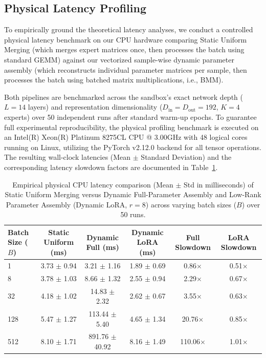 \documentclass{article}
\theoremstyle{plain}
\theoremstyle{definition}
\theoremstyle{remark}
\begin{document}
\subsection{Physical Latency Profiling}
To empirically ground the theoretical latency analyses, we conduct a controlled physical latency benchmark on our CPU hardware comparing Static Uniform Merging (which merges expert matrices once, then processes the batch using standard GEMM) against our vectorized sample-wise dynamic parameter assembly (which reconstructs individual parameter matrices per sample, then processes the batch using batched matrix multiplications, i.e., BMM). 

Both pipelines are benchmarked across the sandbox's exact network depth ($L=14$ layers) and representation dimensionality ($D_{\text{in}} = D_{\text{out}} = 192$, $K=4$ experts) over 50 independent runs after standard warm-up epochs. To guarantee full experimental reproducibility, the physical profiling benchmark is executed on an Intel(R) Xeon(R) Platinum 8275CL CPU @ 3.00GHz with 48 logical cores running on Linux, utilizing the PyTorch v2.12.0 backend for all tensor operations. The resulting wall-clock latencies (Mean $\pm$ Standard Deviation) and the corresponding latency slowdown factors are documented in Table~\ref{tab:physical_latency}.

\begin{table}[ht]
\caption{Empirical physical CPU latency comparison (Mean $\pm$ Std in milliseconds) of Static Uniform Merging versus Dynamic Full-Parameter Assembly and Low-Rank Parameter Assembly (Dynamic LoRA, $r=8$) across varying batch sizes ($B$) over 50 runs.}
\label{tab:physical_latency}
\begin{center}
\setlength{\tabcolsep}{5pt}
\begin{tabular}{lccccc}
\toprule
\textbf{Batch Size ($B$)} & \textbf{Static Uniform (ms)} & \textbf{Dynamic Full (ms)} & \textbf{Dynamic LoRA (ms)} & \textbf{Full Slowdown} & \textbf{LoRA Slowdown} \\
\midrule
1   & 3.73 $\pm$ 0.94 & 3.21 $\pm$ 1.16 & 1.89 $\pm$ 0.69 & 0.86$\times$ & 0.51$\times$ \\
8   & 3.78 $\pm$ 1.03 & 8.66 $\pm$ 1.32 & 2.55 $\pm$ 0.94 & 2.29$\times$ & 0.67$\times$ \\
32  & 4.18 $\pm$ 1.02 & 14.83 $\pm$ 2.32 & 2.62 $\pm$ 0.67 & 3.55$\times$ & 0.63$\times$ \\
128 & 5.47 $\pm$ 1.27 & 113.44 $\pm$ 5.40 & 4.65 $\pm$ 1.34 & 20.76$\times$ & 0.85$\times$ \\
512 & 8.10 $\pm$ 1.71 & 891.76 $\pm$ 40.92 & 8.16 $\pm$ 1.49 & 110.06$\times$ & 1.01$\times$ \\
\bottomrule
\end{tabular}
\end{center}
\end{table}
\end{document}
